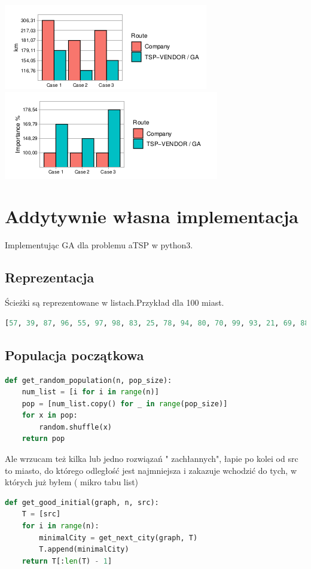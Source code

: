 \documentclass[11pt]{article}
\begin{document}
\includegraphics[scale=1.0]{gr2.png}
\includegraphics[scale=1.0]{gr3.png}
\section{Addytywnie własna implementacja}
Implementując GA dla problemu aTSP w python3.
\subsection{Reprezentacja}
Ścieżki są reprezentowane w listach.Przykład dla 100 miast.
\begin{lstlisting}[language=Python]
[57, 39, 87, 96, 55, 97, 98, 83, 25, 78, 94, 80, 70, 99, 93, 21, 69, 88, 95, 72, 76, 89, 85, 36, 92, 59, 20, 6, 38, 28, 60, 16, 5, 51, 48, 1, 90, 67, 86, 45, 49, 34, 91, 19, 35, 30, 53, 77, 62, 82, 64, 7, 63, 73, 47, 15, 0, 79, 44, 43, 14, 42, 84, 46, 71, 81, 40, 31, 11, 10, 33, 61, 23, 65, 24, 66, 37, 18, 75, 3, 32, 29, 4, 41, 27, 50, 17, 26, 12, 58, 74, 54, 2, 56, 13, 52, 68, 8, 9, 22]
\end{lstlisting}
\subsection{Populacja początkowa}
\begin{lstlisting}[language=Python]
def get_random_population(n, pop_size):
    num_list = [i for i in range(n)]
    pop = [num_list.copy() for _ in range(pop_size)]
    for x in pop:
        random.shuffle(x)
    return pop
\end{lstlisting}
Ale wrzucam też kilka lub jedno rozwiązań " zachłannych", łapie po kolei od src to miasto, do którego odległość jest najmniejsza i zakazuje wchodzić do tych, w których już byłem ( mikro tabu list)
\begin{lstlisting}[language=Python]
def get_good_initial(graph, n, src):
    T = [src]
    for i in range(n):
        minimalCity = get_next_city(graph, T)
        T.append(minimalCity)
    return T[:len(T) - 1]
\end{lstlisting}
\end{document}
